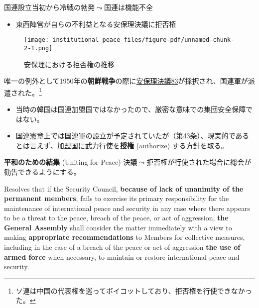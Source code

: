 \documentclass[
  xelatex,
  ja=standard]{bxjsarticle}
\providecommand{\tightlist}{%
  \setlength{\itemsep}{0pt}\setlength{\parskip}{0pt}}\usepackage{longtable,booktabs,array}
\begin{document}
国連設立当初から冷戦の勃発\(\leadsto\)国連は機能不全

\begin{itemize}
\tightlist
\item
  東西陣営が自らの不利益となる安保理決議に拒否権
\end{itemize}

\begin{figure}[htpb]

{\centering \texttt{[image: institutional\_peace\_files/figure-pdf/unnamed-chunk-2-1.png]}

}

\caption{安保理における拒否権の推移}

\end{figure}

唯一の例外として1950年の\textbf{朝鮮戦争}の際に\href{https://ja.wikisource.org/wiki/\%E5\%9B\%BD\%E9\%9A\%9B\%E9\%80\%A3\%E5\%90\%88\%E5\%AE\%89\%E5\%85\%A8\%E4\%BF\%9D\%E9\%9A\%9C\%E7\%90\%86\%E4\%BA\%8B\%E4\%BC\%9A\%E6\%B1\%BA\%E8\%AD\%B083}{安保理決議83}が採択され、国連軍が派遣された。\footnote{ソ連は中国の代表権を巡ってボイコットしており、拒否権を行使できなかった。}

\begin{itemize}
\tightlist
\item
  当時の韓国は国連加盟国ではなかったので、厳密な意味での集団安全保障ではない。
\item
  国連憲章上では国連軍の設立が予定されていたが（第43条）、現実的であるとは言えず、加盟国に武力行使を\textbf{授権}
  (authorize) する方針を取る。
\end{itemize}

\textbf{平和のための結集} (Uniting for Peace)
決議\(\leadsto\)拒否権が行使された場合に総会が勧告できるようにする。

\begin{tcolorbox}[enhanced jigsaw, left=2mm, toprule=.15mm, opacityback=0, colframe=quarto-callout-note-color-frame, opacitybacktitle=0.6, breakable, coltitle=black, colbacktitle=quarto-callout-note-color!10!white, colback=white, bottomtitle=1mm, toptitle=1mm, titlerule=0mm, title=\textcolor{quarto-callout-note-color}{\faInfo}\hspace{0.5em}{平和のための結集決議　主文1}, arc=.35mm, rightrule=.15mm, bottomrule=.15mm, leftrule=.75mm]

Resolves that if the Security Council, \textbf{because of lack of
unanimity of the permanent members}, fails to exercise its primary
responsibility for the maintenance of international peace and security
in any case where there appears to be a threat to the peace, breach of
the peace, or act of aggression, \textbf{the General Assembly} shall
consider the matter immediately with a view to making
\textbf{appropriate recommendations} to Members for collective measures,
including in the case of a breach of the peace or act of aggression
\textbf{the use of armed force} when necessary, to maintain or restore
international peace and security.

\end{tcolorbox}
\end{document}
